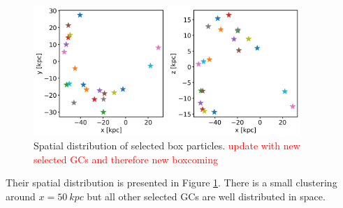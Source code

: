 \begin{figure}[htbp]
\captionsetup{format=plain}
    \centering
    \includegraphics[width=0.9\textwidth]{plots/Dynamics/prog2/gowidsk_progenitor2_box_distribution.png}
    \caption{Spatial distribution of selected box particles. \textcolor{red}{update with new selected GCs and therefore new boxcoming}}
    \label{fig:box_GCs_distr}
\end{figure}

Their spatial distribution is presented in Figure \ref{fig:box_GCs_distr}. There is a small clustering around $x = \SI{50}{kpc}$ but all other selected GCs are well distributed in space. 

